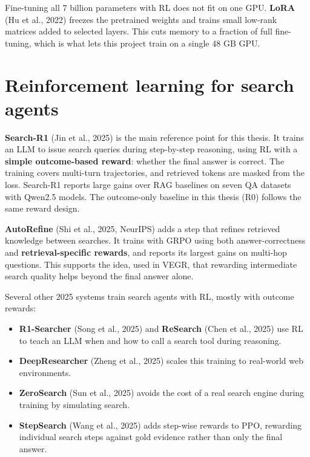 Fine-tuning all 7 billion parameters with RL does not fit on one GPU.
\textbf{LoRA} (Hu et al., 2022) freezes the pretrained weights and
trains small low-rank matrices added to selected layers. This cuts
memory to a fraction of full fine-tuning, which is what lets this
project train on a single 48 GB GPU.

\section{Reinforcement learning for search agents}\label{sec:2.6}

\textbf{Search-R1} (Jin et al., 2025) is the main reference point for
this thesis. It trains an LLM to issue search queries during
step-by-step reasoning, using RL with a \textbf{simple outcome-based
reward}: whether the final answer is correct. The training covers
multi-turn trajectories, and retrieved tokens are masked from the loss.
Search-R1 reports large gains over RAG baselines on seven QA datasets
with Qwen2.5 models. The outcome-only baseline in this thesis (R0)
follows the same reward design.

\textbf{AutoRefine} (Shi et al., 2025, NeurIPS) adds a step that refines
retrieved knowledge between searches. It trains with GRPO using both
answer-correctness and \textbf{retrieval-specific rewards}, and reports
its largest gains on multi-hop questions. This supports the idea, used
in VEGR, that rewarding intermediate search quality helps beyond the
final answer alone.

Several other 2025 systems train search agents with RL, mostly with
outcome rewards:

\begin{itemize}
\tightlist
\item
  \textbf{R1-Searcher} (Song et al., 2025) and \textbf{ReSearch} (Chen
  et al., 2025) use RL to teach an LLM when and how to call a search
  tool during reasoning.
\item
  \textbf{DeepResearcher} (Zheng et al., 2025) scales this training to
  real-world web environments.
\item
  \textbf{ZeroSearch} (Sun et al., 2025) avoids the cost of a real
  search engine during training by simulating search.
\item
  \textbf{StepSearch} (Wang et al., 2025) adds step-wise rewards to PPO,
  rewarding individual search steps against gold evidence rather than
  only the final answer.
\end{itemize}

